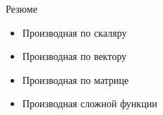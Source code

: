 \documentclass[12pt,russian]{beamer}
\begin{document}
\begin{frame}{Резюме}
\begin{itemize}
\item Производная по скаляру
\item Производная по вектору
\item Производная по матрице
\item Производная сложной функции
\end{itemize}
\end{frame}
\end{document}
